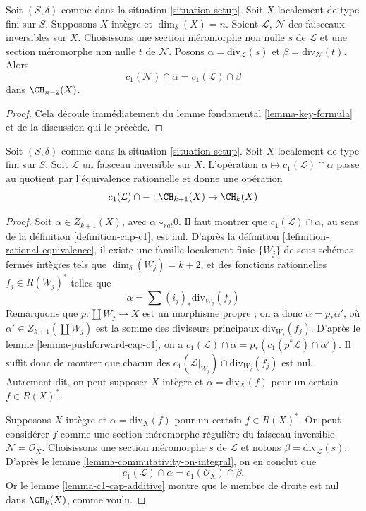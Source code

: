 \begin{lemma}
\label{lemma-commutativity-on-integral}
Soit $(S, \delta)$ comme dans la situation \ref{situation-setup}.
Soit $X$ localement de type fini sur $S$.
Supposons $X$ intègre et $\dim_\delta(X) = n$.
Soient $\mathcal{L}$, $\mathcal{N}$ des faisceaux inversibles sur $X$.
Choisissons une section méromorphe non nulle $s$ de $\mathcal{L}$
et une section méromorphe non nulle $t$ de $\mathcal{N}$.
Posons $\alpha = \text{div}_\mathcal{L}(s)$ et
$\beta = \text{div}_\mathcal{N}(t)$.
Alors
$$
c_1(\mathcal{N}) \cap \alpha
=
c_1(\mathcal{L}) \cap \beta
$$
dans $\CH_{n - 2}(X)$.
\end{lemma}

\begin{proof}
Cela découle immédiatement du lemme fondamental \ref{lemma-key-formula}
et de la discussion qui le précède.
\end{proof}

\begin{lemma}
\label{lemma-factors}
Soit $(S, \delta)$ comme dans la situation \ref{situation-setup}.
Soit $X$ localement de type fini sur $S$.
Soit $\mathcal{L}$ un faisceau inversible sur $X$.
L'opération $\alpha \mapsto c_1(\mathcal{L}) \cap \alpha$
passe au quotient par l'équivalence rationnelle et donne une opération
$$
c_1(\mathcal{L}) \cap - : \CH_{k + 1}(X) \to \CH_k(X)
$$
\end{lemma}

\begin{proof}
Soit $\alpha \in Z_{k + 1}(X)$, avec $\alpha \sim_{rat} 0$.
Il faut montrer que $c_1(\mathcal{L}) \cap \alpha$,
au sens de la définition \ref{definition-cap-c1}, est nul.
D'après la définition \ref{definition-rational-equivalence}, il
existe une famille localement finie $\{W_j\}$ de sous-schémas fermés
intègres tels que $\dim_\delta(W_j) = k + 2$, et des fonctions rationnelles
$f_j \in R(W_j)^*$ telles que
$$
\alpha = \sum (i_j)_*\text{div}_{W_j}(f_j)
$$
Remarquons que $p : \coprod W_j \to X$ est un morphisme propre ;
on a donc $\alpha = p_*\alpha'$, où $\alpha' \in Z_{k + 1}(\coprod W_j)$
est la somme des diviseurs principaux $\text{div}_{W_j}(f_j)$.
D'après le lemme \ref{lemma-pushforward-cap-c1}, on a
$c_1(\mathcal{L}) \cap \alpha = p_*(c_1(p^*\mathcal{L}) \cap \alpha')$.
Il suffit donc de montrer que chacun des
$c_1(\mathcal{L}|_{W_j}) \cap \text{div}_{W_j}(f_j)$ est nul.
Autrement dit, on peut supposer $X$ intègre et
$\alpha = \text{div}_X(f)$ pour un certain $f \in R(X)^*$.

\medskip\noindent
Supposons $X$ intègre et $\alpha = \text{div}_X(f)$ pour un certain $f \in R(X)^*$.
On peut considérer $f$ comme une section méromorphe régulière du faisceau
inversible $\mathcal{N} = \mathcal{O}_X$. Choisissons une section méromorphe
$s$ de $\mathcal{L}$ et notons $\beta = \text{div}_\mathcal{L}(s)$.
D'après le lemme \ref{lemma-commutativity-on-integral},
on en conclut que
$$
c_1(\mathcal{L}) \cap \alpha = c_1(\mathcal{O}_X) \cap \beta.
$$
Or le lemme \ref{lemma-c1-cap-additive} montre que le membre de droite
est nul dans $\CH_k(X)$, comme voulu.
\end{proof}

